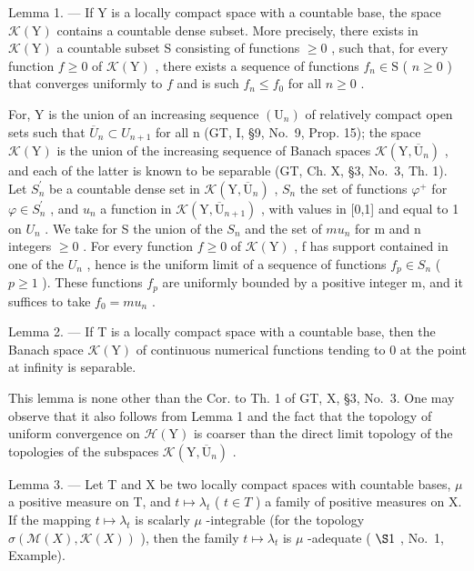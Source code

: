 Lemma 1. --- If Y is a locally compact space with a countable base, the space \(\mathcal{K}(\mathrm{Y})\) contains a countable dense subset. More precisely, there exists in \(\mathcal{K}(\mathrm{Y})\) a countable subset S consisting of functions \(\geqslant 0\) , such that, for every function \(f \geqslant 0\) of \(\mathcal{K}(\mathrm{Y})\) , there exists a sequence of functions \(f_n \in \mathrm{S}\) ( \(n \geqslant 0\) ) that converges uniformly to \(f\) and is such \(f_n \leqslant f_0\) for all \(n \geqslant 0\) .

For, Y is the union of an increasing sequence \((\mathrm{U}_{n})\) of relatively compact open sets such that \(\overline{U}_{n} \subset U_{n+1}\) for all n (GT, I, §9, No.~9, Prop. 15); the space \(\mathcal{K}(\mathrm{Y})\) is the union of the increasing sequence of Banach spaces \(\mathcal{K}(\mathrm{Y}, \overline{\mathrm{U}}_{n})\) , and each of the latter is known to be separable (GT, Ch. X, §3, No.~3, Th. 1). Let \(S_{n}^{\prime}\) be a countable dense set in \(\mathcal{K}(\mathrm{Y}, \overline{\mathrm{U}}_{n})\) , \(S_{n}\) the set of functions \(\varphi^{+}\) for \(\varphi \in S_{n}^{\prime}\) , and \(u_{n}\) a function in \(\mathcal{K}(\mathrm{Y}, \overline{\mathrm{U}}_{n+1})\) , with values in {[}0,1{]} and equal to 1 on \(U_{n}\) . We take for S the union of the \(S_{n}\) and the set of \(mu_{n}\) for m and n integers \(\geqslant 0\) . For every function \(f \geqslant 0\) of \(\mathcal{K}(\mathrm{Y})\) , f has support contained in one of the \(U_{n}\) , hence is the uniform limit of a sequence of functions \(f_{p} \in S_{n}\) ( \(p \geqslant 1\) ). These functions \(f_{p}\) are uniformly bounded by a positive integer m, and it suffices to take \(f_{0} = mu_{n}\) .

Lemma 2. --- If T is a locally compact space with a countable base, then the Banach space \(\mathcal{K}(\mathrm{Y})\) of continuous numerical functions tending to 0 at the point at infinity is separable.

This lemma is none other than the Cor. to Th. 1 of GT, X, §3, No.~3. One may observe that it also follows from Lemma 1 and the fact that the topology of uniform convergence on \(\mathcal{H}(\mathrm{Y})\) is coarser than the direct limit topology of the topologies of the subspaces \(\mathcal{K}(\mathrm{Y},\overline{\mathrm{U}}_n)\) .

Lemma 3. --- Let T and X be two locally compact spaces with countable bases, \(\mu\) a positive measure on T, and \(t \mapsto \lambda_{t}\) ( \(t \in T\) ) a family of positive measures on X. If the mapping \(t \mapsto \lambda_{t}\) is scalarly \(\mu\) -integrable (for the topology \(\sigma(\mathcal{M}(X), \mathcal{K}(X))\) ), then the family \(t \mapsto \lambda_{t}\) is \(\mu\) -adequate ( \(\S1\) , No.~1, Example).

